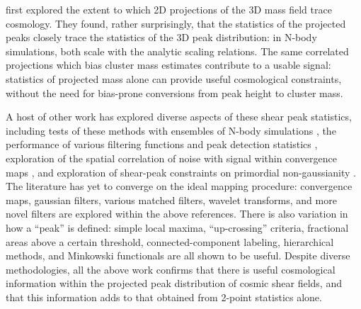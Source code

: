 \citet{Marian09,Marian10} first explored the extent to which 2D 
projections of the
3D mass field trace cosmology.  They found, rather surprisingly, that the
statistics of the projected peaks closely trace the statistics of the 3D
peak distribution: in N-body simulations, both scale 
with the \citet{Sheth99} analytic
scaling relations.  The same correlated projections which bias
cluster mass estimates contribute to a usable signal: 
statistics of projected mass alone can provide useful cosmological 
constraints, without the need for bias-prone conversions from peak 
height to cluster mass.

A host of other work has explored diverse aspects of these
shear peak statistics,
including tests of these methods with ensembles of N-body simulations
\citep{Wang09,Kratochvil10,Dietrich10},
the performance of various filtering functions
and peak detection statistics \citep{Pires09,Schmidt10,Kratochvil11},
exploration of the spatial correlation of noise with signal
within convergence maps \citep{Fan10},
and exploration of shear-peak constraints on primordial non-gaussianity
\citep{Maturi11}.  The literature has yet to converge
on the ideal mapping procedure: convergence maps, gaussian filters,
various matched filters, wavelet transforms, and more novel filters
are explored within the above references.  There is also variation in
how a ``peak'' is defined: simple local maxima, ``up-crossing'' criteria, 
fractional areas above a certain threshold, connected-component labeling, 
hierarchical methods, and Minkowski functionals are all shown to be useful.  
Despite diverse methodologies, all the above work confirms that there 
is useful cosmological information within the projected peak 
distribution of cosmic shear fields, and that this information adds to 
that obtained from 2-point statistics alone.

